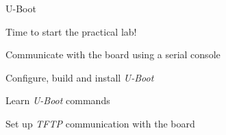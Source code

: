 \setuplabframe
{U-Boot}
{
  Time to start the practical lab!
  \startitemize
  \item Communicate with the board using a serial console
  \item Configure, build and install {\em U-Boot}
  \item Learn {\em U-Boot} commands
  \item Set up {\em TFTP} communication with the board
  \stopitemize
}
